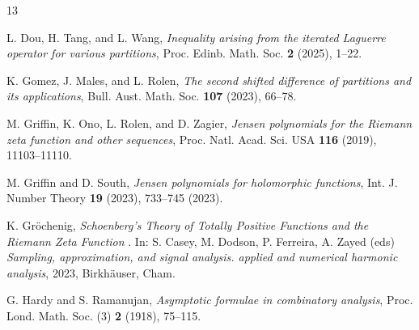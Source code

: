 \documentclass[11pt,reqno,a4paper]{amsart}
\renewcommand{\(}{\left\(}
\renewcommand{\)}{\right\)}
\numberwithin{equation}{section}
\theoremstyle{plain}
\theoremstyle{definition} %
\numberwithin{equation}{section}
\begin{document}
\begin{thebibliography}{13}
		
		
		 L. Dou, H. Tang, and L. Wang, {\it Inequality arising from the iterated Laguerre operator for various partitions}, Proc. Edinb. Math. Soc. {\bf 2} (2025), 1--22. %





		 K. Gomez, J. Males, and L. Rolen, {\it The second shifted difference of partitions and its applications}, Bull. Aust. Math. Soc. {\bf 107} (2023), 66--78.
		
		 M. Griffin, K. Ono, L. Rolen, and D. Zagier, {\it Jensen polynomials for the Riemann zeta function and other sequences}, Proc. Natl. Acad. Sci. USA {\bf 116} (2019), 11103--11110.
		
		 M. Griffin and D. South, {\it Jensen polynomials for holomorphic functions}, Int. J. Number Theory {\bf 19} (2023),  733--745 (2023).
		
		 K. Gr\"ochenig, {\it Schoenberg’s Theory of Totally Positive Functions and the Riemann Zeta Function} . In:  S. Casey, M. Dodson, P. Ferreira, A. Zayed (eds) {\it Sampling, approximation, and signal analysis. applied and numerical harmonic analysis}, 2023, Birkh\"auser, Cham. 

		 G. Hardy and S. Ramanujan, {\it Asymptotic formulae in combinatory analysis}, Proc. Lond. Math. Soc. (3) {\bf 2} (1918), 75--115. %
		

\end{thebibliography}
\end{document}
